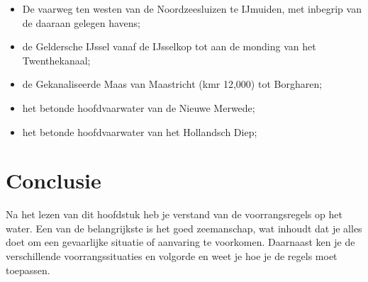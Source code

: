 \begin{itemize}
	\item De vaarweg ten westen van de Noordzeesluizen te IJmuiden, met inbegrip van de daaraan gelegen havens;
	\item de Geldersche IJssel vanaf de IJsselkop tot aan de monding van het Twenthekanaal;
	\item de Gekanaliseerde Maas van Maastricht (kmr 12,000) tot Borgharen;
	\item het betonde hoofdvaarwater van de Nieuwe Merwede;
	\item het betonde hoofdvaarwater van het Hollandsch Diep;
\end{itemize}

\section{Conclusie}
Na het lezen van dit hoofdstuk heb je verstand van de voorrangsregels op het water. Een van de belangrijkste is het goed zeemanschap, wat inhoudt dat je alles doet om een gevaarlijke situatie of aanvaring te voorkomen. Daarnaast ken je de verschillende voorrangssituaties en volgorde en weet je hoe je de regels moet toepassen. 
